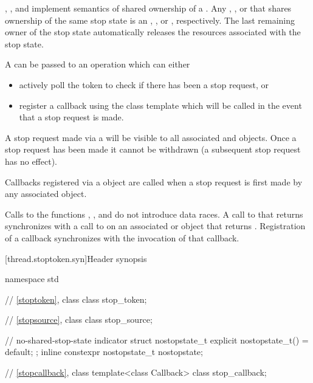 \pnum
{}, , and 
implement semantics of shared ownership of a .
Any , , or 
that shares ownership of the same stop state is an 
, , or , respectively.
The last remaining owner of the stop state automatically
releases the resources associated with the stop state.

\pnum
A  can be passed to an operation which can either
\begin{itemize}
 \item actively poll the token to check if there has been a stop request, or
 \item register a callback using the  class template which
        will be called in the event that a stop request is made.
\end{itemize}
A stop request made via a  will be visible to all
associated  and  objects.
Once a stop request has been made it cannot be withdrawn
(a subsequent stop request has no effect).

\pnum
Callbacks registered via a  object are called when
a stop request is first made by any associated  object.

\pnum
Calls to the functions , ,
and 
do not introduce data races.
A call to  that returns 
synchronizes with a call to 
on an associated  or  object
that returns .
Registration of a callback synchronizes with the invocation of that callback.


[thread.stoptoken.syn]{Header  synopsis}

%
\begin{codeblock}
namespace std {
  // \ref{stoptoken}, class 
  class stop_token;

  // \ref{stopsource}, class 
  class stop_source;

  // no-shared-stop-state indicator
  struct nostopstate_t {
    explicit nostopstate_t() = default;
  };
  inline constexpr nostopstate_t nostopstate{};

  // \ref{stopcallback}, class 
  template<class Callback>
  class stop_callback;
}
\end{codeblock}


